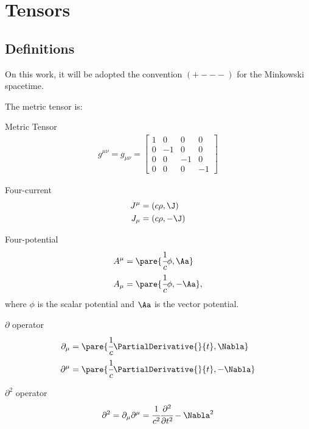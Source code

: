 \section{Tensors}

\subsection{Definitions}
On this work, it will be adopted the convention $(+ - - -)$ for the Minkowski spacetime.

The metric tensor is:
\begin{definition}{Metric Tensor}
  \begin{align}
    g^{\mu\nu} = g_{\mu\nu} =
      \begin{bmatrix}
        1 & 0 & 0 & 0 \\
        0 & -1 & 0 & 0 \\
        0 & 0 & -1 & 0 \\
        0 & 0 & 0 & -1
      \end{bmatrix}
  \end{align}
\end{definition}

\begin{definition}{Four-current}
  \begin{align}
    J^\mu &= (c\rho, \J) \\
    J_\mu &= (c\rho, -\J)
  \end{align}
\end{definition}

\begin{definition}{Four-potential}
  \begin{align}
    A^\mu &= \pare{\cfrac{1}{c}\phi, \Aa} \\
    A_\mu &= \pare{\cfrac{1}{c}\phi, -\Aa},
  \end{align}
  where $\phi$ is the scalar potential and $\Aa$ is the vector potential.
\end{definition}

\begin{definition}{$\partial$ operator}
  \begin{align}
    \partial_\mu &= \pare{\cfrac{1}{c}\PartialDerivative{}{t}, \Nabla}\\
    \partial^\mu &= \pare{\cfrac{1}{c}\PartialDerivative{}{t}, -\Nabla}
  \end{align}
\end{definition}

\begin{definition}{$\partial^2$ operator}
  \begin{align}
    \partial^2 = \partial_\mu \partial^\mu = \cfrac{1}{c^2}\cfrac{\partial^2}{\partial t^2} - \Nabla^2
  \end{align}
\end{definition}

